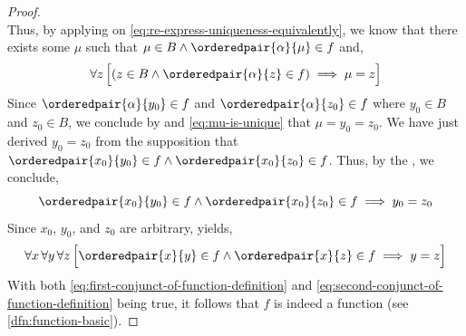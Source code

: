 \begin{proof}
\begin{equation}
    \end{equation}
    Thus, by applying  on \eqref{eq:re-express-uniqueness-equivalently}, we know that
    there exists some \( \mu \) such that \( \mu \in B \land \orderedpair{\alpha}{\mu} \in f \) and,
    \begin{equation}
        \label{eq:mu-is-unique}
        \forall z \, \Big[ \mleft( z \in B \land \orderedpair{\alpha}{z} \in f \mright) \implies \mu = z \Big]
    \end{equation}
    Since \( \orderedpair{\alpha}{y_{0}} \in f \) and \( \orderedpair{\alpha}{z_{0}} \in f \) where \( y_{0} \in B \)
    and \( z_{0} \in B \), we conclude by  and \eqref{eq:mu-is-unique} that \( \mu = y_{0} = z_{0} \).
    We have just derived \( y_{0} = z_{0} \) from the supposition that
    \( \orderedpair{x_{0}}{y_{0}} \in f \land \orderedpair{x_{0}}{z_{0}} \in f \). Thus, by the , we
    conclude,
    \begin{equation*}
        \orderedpair{x_{0}}{y_{0}} \in f \land \orderedpair{x_{0}}{z_{0}} \in f \implies y_{0} = z_{0}
    \end{equation*}
    Since \( x_{0} \), \( y_{0} \), and \( z_{0} \) are arbitrary,  yields,
    \begin{equation}
        \label{eq:second-conjunct-of-function-definition}
        \forall x \, \forall y \, \forall z \, \Big[ \orderedpair{x}{y} \in f \land \orderedpair{x}{z} \in f \implies y = z \Big]
    \end{equation}
    With both \eqref{eq:first-conjunct-of-function-definition} and \eqref{eq:second-conjunct-of-function-definition} being true,
    it follows that \( f \) is indeed a function (see \cref{dfn:function-basic}).


\end{proof}
